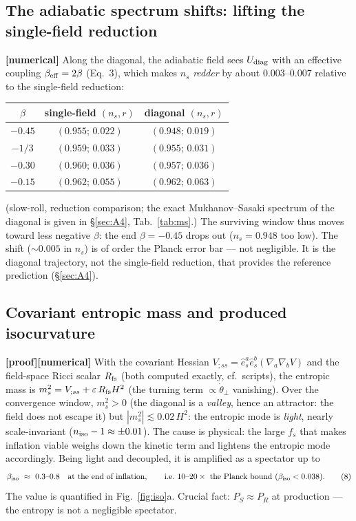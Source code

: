 \documentclass[11pt,a4paper]{article}
\newcommand{\st}[1]{\textbf{\textcolor{blue!45!black}{[#1]}}}
\begin{document}
\subsection{The adiabatic spectrum shifts: lifting the single-field reduction}
\st{numerical} Along the diagonal, the adiabatic field sees $U_{\rm diag}$ with an effective coupling $\beta_{\rm eff}=2\beta$ (Eq.~3), which makes $n_s$ \emph{redder} by about $0.003$--$0.007$ relative to the single-field reduction:
\begin{center}\small
\begin{tabular}{ccc}
\toprule
$\beta$ & single-field $(n_s,r)$ & diagonal $(n_s,r)$ \\
\midrule
$-0.45$ & $(0.955;\,0.022)$ & $(0.948;\,0.019)$ \\
$-1/3$  & $(0.959;\,0.033)$ & $(0.955;\,0.031)$ \\
$-0.30$ & $(0.960;\,0.036)$ & $(0.957;\,0.036)$ \\
$-0.15$ & $(0.962;\,0.055)$ & $(0.962;\,0.063)$ \\
\bottomrule
\end{tabular}
\end{center}
(slow-roll, reduction comparison; the exact Mukhanov--Sasaki spectrum of the diagonal is given in \S\ref{sec:A4}, Tab.~\ref{tab:ms}.) The surviving window thus moves toward less negative $\beta$: the end $\beta=-0.45$ drops out ($n_s=0.948$ too low). The shift ($\sim0.005$ in $n_s$) is of order the Planck error bar --- not negligible. It is the diagonal trajectory, not the single-field reduction, that provides the reference prediction (\S\ref{sec:A4}).

\subsection{Covariant entropic mass and produced isocurvature}
\st{proof}\st{numerical} With the covariant Hessian $V_{;ss}=\hat e_s^a\hat e_s^b(\nabla_a\nabla_b V)$ and the field-space Ricci scalar $R_{\rm fs}$ (both computed exactly, cf.\ scripts), the entropic mass is $m^2_s=V_{;ss}+\varepsilon\,R_{\rm fs}H^2$ (the turning term $\propto\dot\theta_\perp$ vanishing). Over the convergence window, $m^2_s>0$ (the diagonal is a \emph{valley}, hence an attractor: the field does not escape it) but $|m^2_s|\lesssim0.02\,H^2$: the entropic mode is \emph{light}, nearly scale-invariant ($n_{\rm iso}-1\approx\pm0.01$). The cause is physical: the large $f_s$ that makes inflation viable weighs down the kinetic term and lightens the entropic mode accordingly. Being light and decoupled, it is amplified as a spectator up to
\begin{equation}
\beta_{\rm iso}\ \approx\ 0.3\text{--}0.8\quad\text{at the end of inflation},\qquad\text{i.e.\ }10\text{--}20\times\text{ the Planck bound }(\beta_{\rm iso}<0.038). \tag{8}
\end{equation}
The value is quantified in Fig.~\ref{fig:iso}a. Crucial fact: $P_S\approx P_R$ at production --- the entropy is not a negligible spectator.
\end{document}
